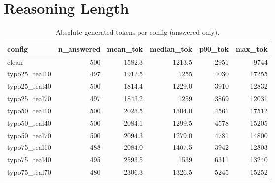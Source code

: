 \documentclass[11pt]{article}
\begin{document}
\section*{Reasoning Length}
\begin{table}[H]
\centering
\caption{Absolute generated tokens per config (answered-only).}
\small
\begin{adjustbox}{max width=\textwidth}
\begin{tabular}{lrrrrr}
\toprule
\textbf{config} & \textbf{n\_answered} & \textbf{mean\_tok} & \textbf{median\_tok} & \textbf{p90\_tok} & \textbf{max\_tok} \\
\midrule
clean & 500 & 1582.3 & 1213.5 & 2951 & 9744 \\
typo25\_real10 & 497 & 1912.5 & 1255 & 4030 & 17255 \\
typo25\_real40 & 500 & 1814.4 & 1229.0 & 3910 & 12832 \\
typo25\_real70 & 497 & 1843.2 & 1259 & 3869 & 12031 \\
typo50\_real10 & 500 & 2023.5 & 1304.0 & 4561 & 17512 \\
typo50\_real40 & 500 & 2084.1 & 1299.5 & 4578 & 15205 \\
typo50\_real70 & 500 & 2094.3 & 1279.0 & 4781 & 14800 \\
typo75\_real10 & 488 & 2084.0 & 1407.5 & 3942 & 12803 \\
typo75\_real40 & 495 & 2593.5 & 1539 & 6311 & 13240 \\
typo75\_real70 & 480 & 2306.3 & 1326.5 & 5245 & 15252 \\
\bottomrule
\end{tabular}
\end{adjustbox}
\end{table}
\end{document}

